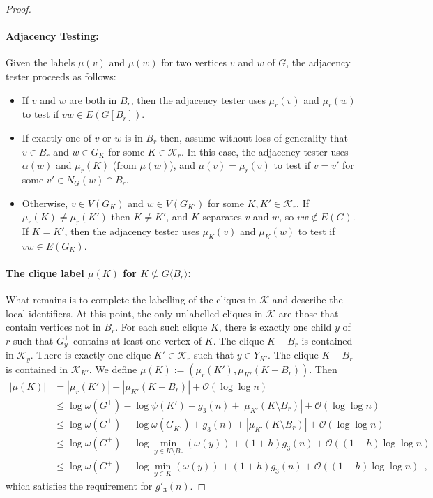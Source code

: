 \documentclass{patmorin}
\renewcommand{\le}{\leqslant}
\newcommand{\torso}[2]{{#1}\langle{#2}\rangle}
\newcommand{\Oh}{\mathcal{O}}
\begin{document}
\begin{proof}
    \paragraph{Adjacency Testing:}
    Given the labels $\mu(v)$ and $\mu(w)$ for two vertices $v$ and $w$ of $G$, the adjacency tester proceeds as follows:
    \begin{itemize}
      \item If $v$ and $w$ are both in $B_r$, then the adjacency tester uses $\mu_r(v)$ and $\mu_r(w)$ to test if $vw\in E(G[B_r])$.
      \item If exactly one of $v$ or $w$ is in $B_r$ then, assume without loss of generality that $v\in B_r$ and $w\in G_K$ for some $K\in\mathcal{K}_r$.
      In this case, the adjacency tester uses $\alpha(w)$ and $\mu_r(K)$ (from $\mu(w)$), and $\mu(v)=\mu_r(v)$ to test if $v=v'$ for some $v'\in N_G(w)\cap B_r$.
      \item Otherwise, $v\in V(G_K)$ and $w\in V(G_{K'})$ for some $K,K'\in\mathcal{K}_r$.
      If $\mu_r(K)\neq\mu_r(K')$ then $K\neq K'$, and $K$ separates $v$ and $w$, so $vw\not\in E(G)$.
      If $K=K'$, then the adjacency tester uses $\mu_K(v)$ and $\mu_K(w)$ to test if $vw\in E(G_K)$.
    \end{itemize}

    \paragraph{\boldmath The clique label $\mu(K)$ for $K\not\subseteq\torso{G}{B_r}$:}  What remains is to complete the labelling of the cliques in $\mathcal{K}$ and describe the local identifiers.
    At this point, the only unlabelled cliques in $\mathcal{K}$ are those that contain vertices not in $B_r$.
    For each such clique $K$, there is exactly one child $y$ of $r$ such that $G^+_y$ contains at least one vertex of $K$.
    The clique $K-B_r$ is contained in $\mathcal{K}_y$.  There is exactly one clique $K'\in\mathcal{K}_r$ such that $y\in Y_{K'}$.
    The clique $K-B_r$ is contained in $\mathcal{K}_{K'}$. We define $\mu(K):=(\mu_r(K'),\mu_{K'}(K-B_r))$.  Then
    \begin{align*}
     |\mu(K)|
       & = |\mu_r(K')| + |\mu_{K'}(K-B_r)| + \Oh(\log\log n) \\
       & \le \log\omega(G^+)-\log\psi(K') + g_3(n) + |\mu_{K'}(K\setminus B_r)| + \Oh(\log\log n) \\
       & \le \log\omega(G^+)-\log\omega(G^+_{K'}) + g_3(n)  + |\mu_{K'}(K\setminus B_r)| + \Oh(\log\log n) \\
       & \le \log\omega(G^+)-\log\min_{y\in K\setminus B_r}(\omega(y)) + (1+h)g_3(n) + \Oh((1+h)\log\log n) \\
       & \le \log\omega(G^+)-\log\min_{y\in K}(\omega(y)) + (1+h)g_3(n) + \Oh((1+h)\log\log n) \enspace ,
    \end{align*}
    which satisfies the requirement for $g'_3(n)$.


\end{proof}
\end{document}
